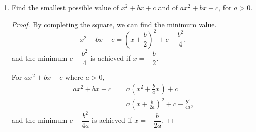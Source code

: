 \begin{exercise}[\textbf{18}]
\begin{enumerate}
\begin{proof}
    We just solve for the values of $\alpha$ that will assure $(\alpha y)^2
    -4y^2$ is less than zero.
    \begin{align*}
        (\alpha y)^2 -4y^2 &<0, \\
        \alpha^2 y^2 &< 4y^2, \\
        \alpha ^2 &< 4, \\
        |\alpha | &< 2. \\
    \end{align*}
    so the values of $\alpha$ that will make $x^2+\alpha xy +y^2 >0$ are
    \begin{equation*}
        -2 <\alpha < 2.
    \end{equation*}
    \end{proof}
    \item Find the smallest possible value of $x^2+bx+c$ and of $ax^2+bx+c$, for
    $a>0$.
    \begin{proof} By completing the square, we can find the minimum value.
        \begin{equation*}
            x^2+bx+c = \left( x+\frac{b}{2}\right)^2 +c-\frac{b^2}{4},
        \end{equation*}
        and the minimum $c-\dfrac{b^2}{4}$ is achieved if $x= -\dfrac{b}{2}$.

        For $ax^2+bx+c$ where $a>0$,
        \begin{align*}
            ax^2+bx+c &= a\left(x^2+\frac{b}{a}x\right)+c \\
            &= a\left( x+ \frac{b}{2a}\right)^2 + c- \frac{b^2}{4a},
        \end{align*}
        and the minimum $c-\dfrac{b^2}{4a}$ is achieved if $x= -\dfrac{b}{2a}$.
    \end{proof}
\end{enumerate}
\end{exercise}
\pagebreak
